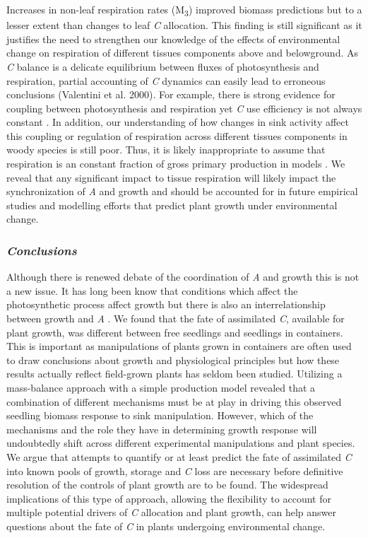 \documentclass[a4paper]{article}\usepackage[]{graphicx}\usepackage[]{color}
\begin{document}
Increases in non-leaf respiration rates  (M\textsubscript{3}) improved biomass predictions but to a lesser extent than changes to leaf \textit{C} allocation.  This finding is still significant as it justifies the need to strengthen our knowledge of the effects of environmental change on respiration of different tissues components above and belowground. As \textit{C} balance is a delicate equilibrium between fluxes of photosynthesis and respiration, partial accounting of \textit{C} dynamics can easily lead to erroneous conclusions (Valentini et al. 2000). For example, there is strong evidence for coupling between photosynthesis and respiration yet \textit{C} use efficiency is not always constant \citep{cannell2000modelling}. In addition, our understanding of how changes in sink activity affect this coupling or regulation of respiration across different tissues components in woody species is still poor.  Thus, it is likely inappropriate to assume that respiration is an constant fraction of gross primary production in models \citep{delucia2007forest}. We reveal that any significant impact to tissue respiration will likely impact the synchronization of \textit{A} and growth and should be accounted for in  future empirical studies and modelling efforts that predict plant growth under environmental change.  

\subsubsection*{\textit{Conclusions}}

Although there is renewed debate of the coordination of \textit{A} and growth this is not a new issue. It has long been know that conditions which affect the photosynthetic process affect growth but there is also an interrelationship between growth and \textit{A} \citep{sweet1966role}. We found that the fate of assimilated \textit{C}, available for plant growth, was different between free seedlings and seedlings in containers. This is important as manipulations of plants grown in containers are often used to draw conclusions about growth and physiological principles but how these results actually reflect field-grown plants has seldom been studied. Utilizing a mass-balance approach with a simple production model revealed that a combination of different mechanisms must be at play in driving this observed seedling biomass response to sink manipulation. However, which of the mechanisms and the role they have in determining growth response will undoubtedly shift across different experimental manipulations and plant species. We argue that attempts to quantify or at least predict the fate of assimilated \textit{C} into known pools of growth, storage and \textit{C} loss are necessary before definitive resolution of the controls of plant growth are to be found. The widespread implications of this type of approach, allowing the flexibility to account for multiple potential drivers of \textit{C} allocation and plant growth, can help answer questions about the fate of \textit{C} in plants undergoing environmental change.
\end{document}
